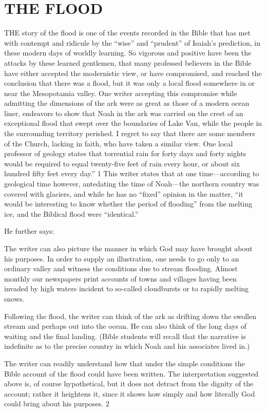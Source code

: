 \chapter{THE FLOOD}

THE story of the flood is one of the events recorded in the Bible that has met with contempt
and ridicule by the ``wise'' and ``prudent'' of Isaiah's prediction, in these modern days of
worldly learning. So vigorous and positive have been the attacks by these learned gentlemen,
that many professed believers in the Bible have either accepted the modernistic view, or have
compromised, and reached the conclusion that there was a flood, but it was only a local flood
somewhere in or near the Mesopotamia valley. One writer accepting this compromise while
admitting the dimensions of the ark were as great as those of a modern ocean liner, endeavors
to show that Noah in the ark was carried on the crest of an exceptional flood that swept over
the boundaries of Lake Van, while the people in the surrounding territory perished. I regret to
say that there are some members of the Church, lacking in faith, who have taken a similar
view. One local professor of geology states that torrential rain for forty days and forty nights
would be required to equal twenty-five feet of rain every hour, or about six hundred fifty feet
every day.'' 1 This writer states that at one time—according to geological time however,
antedating the time of Noah—the northern country was covered with glaciers, and while he
has no ``fixed'' opinion in the matter, ``it would be interesting to know whether the period of
flooding'' from the melting ice, and the Biblical flood were ``identical.''

He further says:

The writer can also picture the manner in which God may have brought about his purposes.
In order to supply an illustration, one needs to go only to an ordinary valley and witness the
conditions due to stream flooding. Almost monthly our newspapers print accounts of towns
and villages having been invaded by high waters incident to so-called cloudbursts or to
rapidly melting snows.

Following the flood, the writer can think of the ark as drifting down the swollen stream and
perhaps out into the ocean. He can also think of the long days of waiting and the final
landing. (Bible students will recall that the narrative is indefinite as to the precise country in
which Noah and his associates lived in.)

The writer can readily understand how that under the simple conditions the Bible account of
the flood could have been written. The interpretation suggested above is, of course
hypothetical, but it does not detract from the dignity of the account; rather it heightens it,
since it shows how simply and how literally God could bring about his purposes. 2

